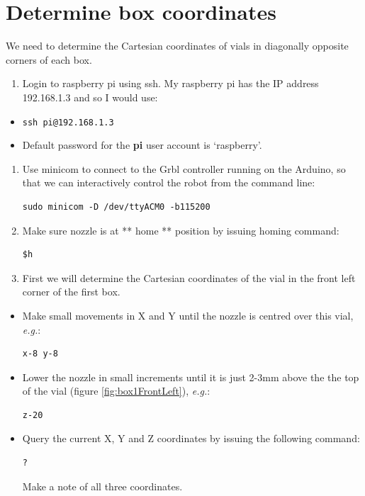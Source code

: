 \documentclass[]{book}
\providecommand{\tightlist}{%
  \setlength{\itemsep}{0pt}\setlength{\parskip}{0pt}}
\theoremstyle{definition}
\theoremstyle{definition}
\theoremstyle{remark}
\begin{document}
\section{Determine box coordinates}\label{boxCoordinates}

We need to determine the Cartesian coordinates of vials in diagonally
opposite corners of each box.

\begin{enumerate}
\def\labelenumi{\arabic{enumi}.}
\tightlist
\item
  Login to raspberry pi using ssh. My raspberry pi has the IP address
  192.168.1.3 and so I would use:
\end{enumerate}

\begin{itemize}
\tightlist
\item
  \texttt{ssh\ pi@192.168.1.3}
\item
  Default password for the \textbf{pi} user account is `raspberry'.
\end{itemize}

\begin{enumerate}
\def\labelenumi{\arabic{enumi}.}
\setcounter{enumi}{1}
\item
  Use minicom to connect to the Grbl controller running on the Arduino,
  so that we can interactively control the robot from the command line:

\begin{verbatim}
sudo minicom -D /dev/ttyACM0 -b115200
\end{verbatim}
\item
  Make sure nozzle is at ** home ** position by issuing homing command:

\begin{verbatim}
$h
\end{verbatim}
\item
  First we will determine the Cartesian coordinates of the vial in the
  front left corner of the first box.
\end{enumerate}

\begin{itemize}
\item
  Make small movements in X and Y until the nozzle is centred over this
  vial, \emph{e.g.}:

\begin{verbatim}
x-8 y-8
\end{verbatim}
\item
  Lower the nozzle in small increments until it is just 2-3mm above the
  the top of the vial (figure \ref{fig:box1FrontLeft}), \emph{e.g.}:

\begin{verbatim}
z-20
\end{verbatim}
\item
  Query the current X, Y and Z coordinates by issuing the following
  command:

\begin{verbatim}
?
\end{verbatim}

  Make a note of all three coordinates.
\end{itemize}
\end{document}
